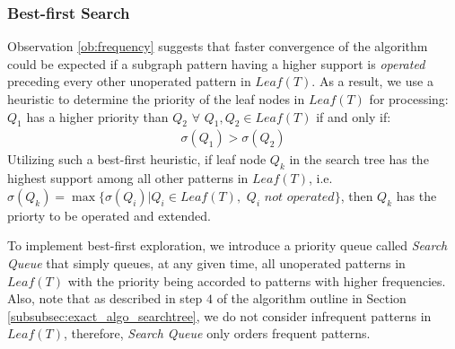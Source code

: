 \subsubsection{Best-first Search}
\label{subsubsec:exact_algo_bestfs}
Observation \ref{ob:frequency} suggests that faster convergence of the algorithm
could be expected if a subgraph pattern having a higher support is
\textit{operated} preceding every other unoperated pattern in $Leaf(T)$. As a result, we
use a heuristic to determine the priority of the leaf nodes in $Leaf(T)$
for processing: $Q_1$ has a higher priority than $Q_2$ $\forall$ $Q_1, Q_2 \in Leaf(T)$ if and only if:
\begin{align}\sigma(Q_1)>\sigma(Q_2)\end{align}
Utilizing such a best-first heuristic, if leaf node $Q_k$ in the search tree has
the highest support among all other patterns in $Leaf(T)$, i.e. $\sigma(Q_k)=\max\{\sigma(Q_i)|Q_i\in Leaf(T),$ $Q_i$ $not$ $operated\}$,
then $Q_k$ has the priorty to be operated and extended.
\par To implement best-first exploration, we introduce a priority queue called \textit{Search Queue} that simply queues,
 at any given time, all unoperated patterns in $Leaf(T)$ with the priority being accorded to patterns with higher frequencies. Also,
 note that as described in step $4$ of the algorithm outline in Section \ref{subsubsec:exact_algo_searchtree}, we do not consider
 infrequent patterns in $Leaf(T)$, therefore, \textit{Search Queue} only orders frequent patterns.


